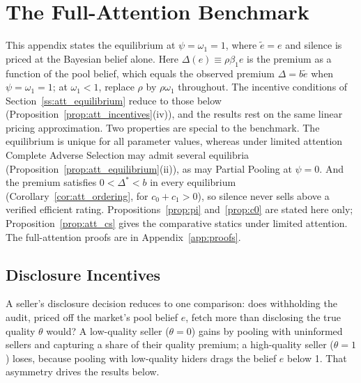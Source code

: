 
\section{The Full-Attention Benchmark}
\label{sec:equilibrium}

This appendix states the equilibrium at $\psi=\omega_1=1$, where $\tilde e=e$ and silence is priced at the Bayesian belief alone. Here $\Delta(e)\equiv\rho\beta_1e$ is the premium as a function of the pool belief, which equals the observed premium $\Delta=b\tilde e$ when $\psi=\omega_1=1$; at $\omega_1<1$, replace $\rho$ by $\rho\omega_1$ throughout. The incentive conditions of Section~\ref{ss:att_equilibrium} reduce to those below (Proposition~\ref{prop:att_incentives}(iv)), and the results rest on the same linear pricing approximation. Two properties are special to the benchmark. The equilibrium is unique for all parameter values, whereas under limited attention Complete Adverse Selection may admit several equilibria (Proposition~\ref{prop:att_equilibrium}(ii)), as may Partial Pooling at $\psi=0$. And the premium satisfies $0<\Delta^*<b$ in every equilibrium (Corollary~\ref{cor:att_ordering}, for $c_0+c_1>0$), so silence never sells above a verified efficient rating. Propositions~\ref{prop:pi} and~\ref{prop:c0} are stated here only; Proposition~\ref{prop:att_cs} gives the comparative statics under limited attention. The full-attention proofs are in Appendix~\ref{app:proofs}.

\subsection{Disclosure Incentives}

A seller's disclosure decision reduces to one comparison: does withholding the audit, priced off the market's pool belief $e$, fetch more than disclosing the true quality $\theta$ would? A low-quality seller ($\theta=0$) gains by pooling with uninformed sellers and capturing a share of their quality premium; a high-quality seller ($\theta=1$) loses, because pooling with low-quality hiders drags the belief $e$ below 1. That asymmetry drives the results below.

